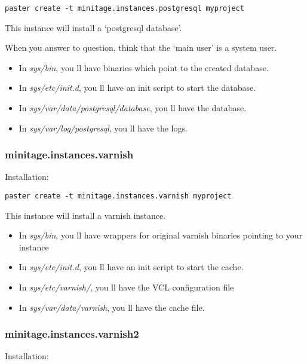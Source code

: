 \documentclass[letterpaper,10pt,english]{sphinxmanual}
\begin{document}
\begin{Verbatim}[commandchars=@\[\]]
paster create -t minitage.instances.postgresql myproject
\end{Verbatim}

This instance will install a `postgresql database'.

When you answer to question, think that the `main user' is a system user.
\begin{itemize}
\item {} 
In \emph{sys/bin}, you ll have binaries which point to the created database.

\item {} 
In \emph{sys/etc/init.d}, you ll have an init script to start the database.

\item {} 
In \emph{sys/var/data/postgresql/database}, you ll have the database.

\item {} 
In \emph{sys/var/log/postgresql}, you ll have the logs.

\end{itemize}


\subsubsection{minitage.instances.varnish}
\label{paster/instances/instances:minitage-instances-varnish}
Installation:

\begin{Verbatim}[commandchars=@\[\]]
paster create -t minitage.instances.varnish myproject
\end{Verbatim}

This instance will install a varnish instance.
\begin{itemize}
\item {} 
In \emph{sys/bin}, you ll have wrappers for original varnish binaries pointing to your instance

\item {} 
In \emph{sys/etc/init.d}, you ll have an init script to start the cache.

\item {} 
In \emph{sys/etc/varnish/}, you ll have the VCL configuration file

\item {} 
In \emph{sys/var/data/varnish}, you ll have the cache file.

\end{itemize}


\subsubsection{minitage.instances.varnish2}
\label{paster/instances/instances:minitage-instances-varnish2}
Installation:
\end{document}
